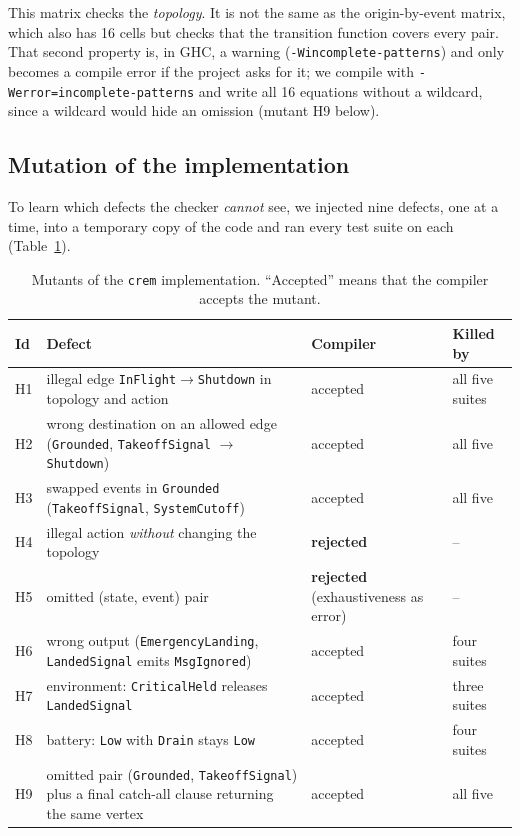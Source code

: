 \documentclass[review]{jfp-epi}
\newcommand{\crem}{\texttt{crem}}
\newcommand{\code}[1]{\texttt{#1}}
\begin{document}
This matrix checks the \emph{topology}. It is not the same as the origin-by-event matrix, which also has 16 cells but checks that the transition function covers every pair. That second property is, in GHC, a warning (\code{-Wincomplete-patterns}) and only becomes a compile error if the project asks for it; we compile with \code{-Werror=incomplete-patterns} and write all 16 equations without a wildcard, since a wildcard would hide an omission (mutant H9 below).

\subsection{Mutation of the implementation}

To learn which defects the checker \emph{cannot} see, we injected nine defects, one at a time, into a temporary copy of the code and ran every test suite on each (Table~\ref{tab:mutants}).

\begin{table}[t]
\caption{Mutants of the \crem{} implementation. ``Accepted'' means that the compiler accepts the mutant.}
\label{tab:mutants}
\footnotesize
\begin{tabular}{@{}lp{5.2cm}lp{2.2cm}@{}}
\toprule
Id & Defect & Compiler & Killed by \\
\midrule
H1 & illegal edge \code{InFlight}$\to$\code{Shutdown} in topology and action & accepted & all five suites \\
H2 & wrong destination on an allowed edge (\code{Grounded}, \code{TakeoffSignal} $\to$ \code{Shutdown}) & accepted & all five \\
H3 & swapped events in \code{Grounded} (\code{TakeoffSignal}, \code{SystemCutoff}) & accepted & all five \\
H4 & illegal action \emph{without} changing the topology & \textbf{rejected} & -- \\
H5 & omitted (state, event) pair & \textbf{rejected} (exhaustiveness as error) & -- \\
H6 & wrong output (\code{EmergencyLanding}, \code{LandedSignal} emits \code{MsgIgnored}) & accepted & four suites \\
H7 & environment: \code{CriticalHeld} releases \code{LandedSignal} & accepted & three suites \\
H8 & battery: \code{Low} with \code{Drain} stays \code{Low} & accepted & four suites \\
H9 & omitted pair (\code{Grounded}, \code{TakeoffSignal}) plus a final catch-all clause returning the same vertex & accepted & all five \\
\bottomrule
\end{tabular}
\end{table}
\end{document}
